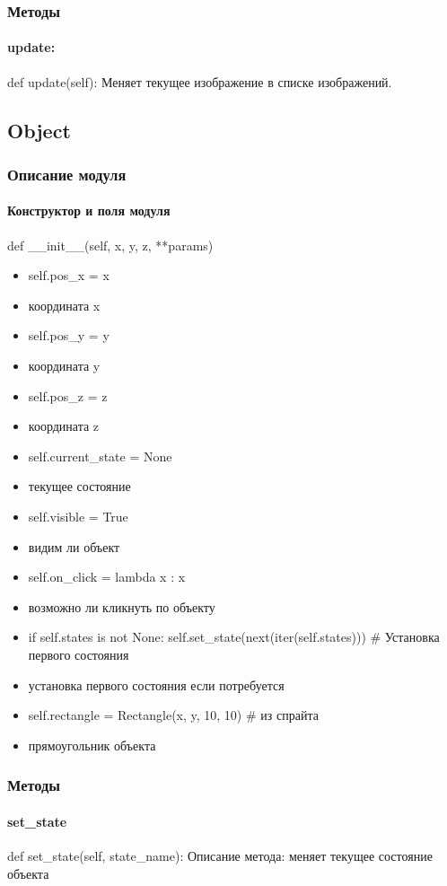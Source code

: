 \subsubsection{Методы}
\paragraph{update:}
def update(self):
Меняет текущее изображение в списке изображений.

\subsection{Object}
\subsubsection{Описание модуля}
\paragraph{Конструктор и поля модуля}
def \_\_init\_\_(self, x, y, z, **params)
\begin{itemize}
	\item self.pos\_x = x
	\item координата x
	\item self.pos\_y = y
	\item координата y
	\item self.pos\_z = z
	\item координата z
	\item self.current\_state = None
	\item текущее состояние
	\item self.visible = True
	\item видим ли объект
	\item self.on\_click = lambda x : x
	\item возможно ли кликнуть по объекту
	\item if self.states is not None:
	self.set\_state(next(iter(self.states)))  # Установка первого состояния
	\item установка первого состояния если потребуется
	\item self.rectangle = Rectangle(x, y, 10, 10) # из спрайта
	\item прямоугольник объекта
\end{itemize}
\subsubsection{Методы}
\paragraph{set\_state}
def set\_state(self, state\_name):
Описание метода: меняет текущее состояние объекта

